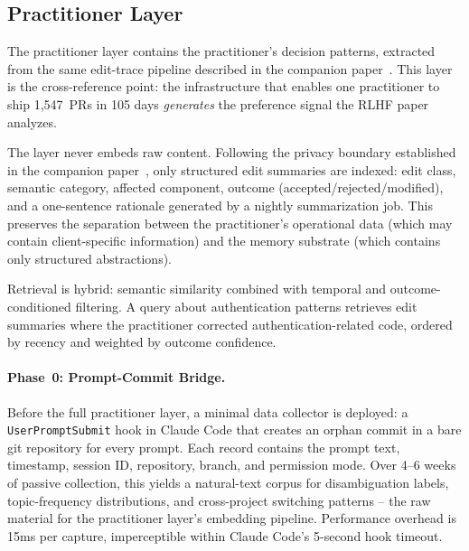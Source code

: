 \documentclass[11pt]{article}
\begin{document}
\subsection{Practitioner Layer}
\label{sec:practitioner-layer}

The practitioner layer contains the practitioner's decision patterns, extracted from the same edit-trace pipeline described in the companion paper~\citep[\S3]{ovcharov2026recursive}.
This layer is the cross-reference point: the infrastructure that enables one practitioner to ship 1{,}547~PRs in 105 days \emph{generates} the preference signal the RLHF paper analyzes.

The layer never embeds raw content.
Following the privacy boundary established in the companion paper~\citep[\S6]{ovcharov2026recursive}, only structured edit summaries are indexed: edit class, semantic category, affected component, outcome (accepted/rejected/modified), and a one-sentence rationale generated by a nightly summarization job.
This preserves the separation between the practitioner's operational data (which may contain client-specific information) and the memory substrate (which contains only structured abstractions).

Retrieval is hybrid: semantic similarity combined with temporal and outcome-conditioned filtering.
A query about authentication patterns retrieves edit summaries where the practitioner corrected authentication-related code, ordered by recency and weighted by outcome confidence.

\paragraph{Phase~0: Prompt-Commit Bridge.}
Before the full practitioner layer, a minimal data collector is deployed: a \texttt{UserPromptSubmit} hook in Claude Code that creates an orphan commit in a bare git repository for every prompt.
Each record contains the prompt text, timestamp, session ID, repository, branch, and permission mode.
Over 4--6 weeks of passive collection, this yields a natural-text corpus for disambiguation labels, topic-frequency distributions, and cross-project switching patterns -- the raw material for the practitioner layer's embedding pipeline.
Performance overhead is 15ms per capture, imperceptible within Claude Code's 5-second hook timeout.


\end{document}
